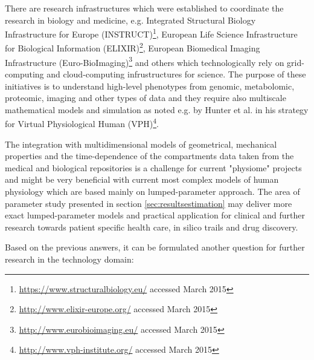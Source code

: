 \begin{itemize}
There are research infrastructures which were established to coordinate the research in biology and medicine, e.g. Integrated Structural Biology Infrastructure for Europe (INSTRUCT)\footnote{\url{https://www.structuralbiology.eu/} accessed March 2015}, European Life Science Infrastructure for Biological Information (ELIXIR)\footnote{\url{http://www.elixir-europe.org/} accessed March 2015},  European Biomedical Imaging Infrastructure (Euro-BioImaging)\footnote{\url{http://www.eurobioimaging.eu/} accessed March 2015} and others which technologically rely on grid-computing and cloud-computing infrustructures for science. The purpose of these initiatives is to understand high-level phenotypes from genomic, metabolomic, proteomic, imaging and other types of data and they require also multiscale mathematical models and simulation as noted e.g. by Hunter et al. \cite{Hunter2013} in his strategy for Virtual Physiological Human (VPH)\footnote{\url{http://www.vph-institute.org/} accessed March 2015}.

The integration with multidimensional models of geometrical, mechanical properties and the time-dependence of the compartments data taken from the medical and biological repositories is a challenge for current "physiome" projects and might be very beneficial with current most complex models of human physiology which are based mainly on lumped-parameter approach. The area of parameter study presented in section \ref{sec:resultsestimation} may deliver more exact lumped-parameter models and practical application for clinical and further research towards patient specific health care, in silico trails and drug discovery. 

\end{itemize}


Based on the previous answers, it can be formulated another question for further research in the technology domain: 

